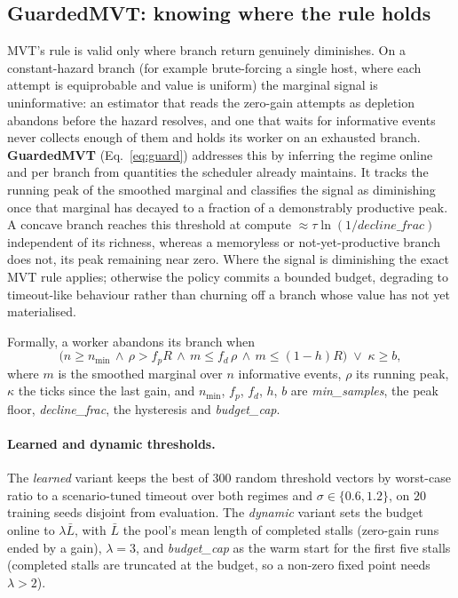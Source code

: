 \documentclass[runningheads]{llncs}
\newcommand{\RR}{R}
\begin{document}
\subsection{GuardedMVT: knowing where the rule holds}
\label{sec:guarded}
MVT's rule is valid only where branch return genuinely diminishes. On a constant-hazard
branch (for example brute-forcing a single host, where each attempt is equiprobable and
value is uniform) the marginal signal is uninformative: an estimator that reads the zero-gain
attempts as depletion abandons before the hazard resolves, and one that waits for informative
events never collects enough of them and holds its worker on an exhausted branch. \textbf{GuardedMVT} (Eq.~\eqref{eq:guard})
addresses this by inferring the regime online and per branch from quantities the
scheduler already maintains. It tracks the running peak of the smoothed marginal and
classifies the signal as diminishing once that marginal has decayed to a fraction of a
demonstrably productive peak. A concave branch reaches this threshold at compute
$\approx\tau\ln(1/\textit{decline\_frac})$ independent of its richness, whereas a
memoryless or not-yet-productive branch does not, its peak remaining near zero. Where the
signal is diminishing the exact MVT rule applies; otherwise the policy commits a bounded
budget, degrading to timeout-like behaviour rather than churning off a branch whose value
has not yet materialised.

Formally, a worker abandons its branch when
\begin{equation}
\bigl(n \ge n_{\min} \,\wedge\, \rho > f_{p}\RR \,\wedge\, m \le f_{d}\,\rho \,\wedge\,
m \le (1-h)\RR\bigr) \;\vee\; \kappa \ge b,
\label{eq:guard}
\end{equation}
where $m$ is the smoothed marginal over $n$ informative events, $\rho$ its running peak,
$\kappa$ the ticks since the last gain, and $n_{\min}$, $f_p$, $f_d$, $h$, $b$ are
\textit{min\_samples}, the peak floor, \textit{decline\_frac}, the hysteresis and
\textit{budget\_cap}.

\paragraph{Learned and dynamic thresholds.}
The \emph{learned} variant keeps the best
of $300$ random threshold vectors by worst-case ratio to a scenario-tuned timeout over both
regimes and $\sigma\in\{0.6,1.2\}$, on $20$ training seeds disjoint from evaluation. The
\emph{dynamic} variant sets the budget online to $\lambda\bar{L}$, with $\bar{L}$ the pool's
mean length of completed stalls (zero-gain runs ended by a gain), $\lambda=3$, and
\textit{budget\_cap} as the warm start for the first five stalls (completed stalls are
truncated at the budget, so a non-zero fixed point needs $\lambda>2$).
\end{document}
